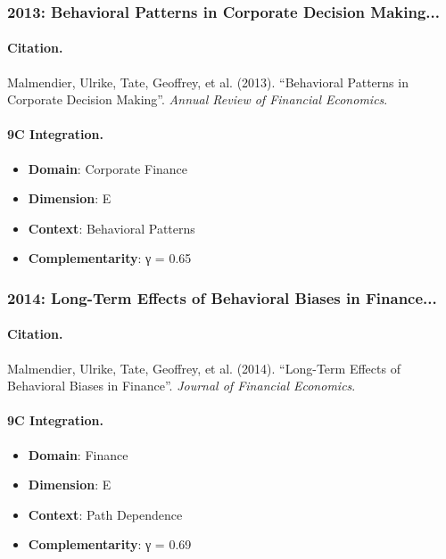 \subsubsection{2013: Behavioral Patterns in Corporate Decision Making...}

\paragraph{Citation.}
Malmendier, Ulrike, Tate, Geoffrey, et al. (2013). ``Behavioral Patterns in Corporate Decision Making''. \textit{Annual Review of Financial Economics}.

\paragraph{9C Integration.}
\begin{itemize}[nosep]
  \item \textbf{Domain}: Corporate Finance
  \item \textbf{Dimension}: E
  \item \textbf{Context}: Behavioral Patterns
  \item \textbf{Complementarity}: γ = 0.65
\end{itemize}


\subsubsection{2014: Long-Term Effects of Behavioral Biases in Finance...}

\paragraph{Citation.}
Malmendier, Ulrike, Tate, Geoffrey, et al. (2014). ``Long-Term Effects of Behavioral Biases in Finance''. \textit{Journal of Financial Economics}.

\paragraph{9C Integration.}
\begin{itemize}[nosep]
  \item \textbf{Domain}: Finance
  \item \textbf{Dimension}: E
  \item \textbf{Context}: Path Dependence
  \item \textbf{Complementarity}: γ = 0.69
\end{itemize}


